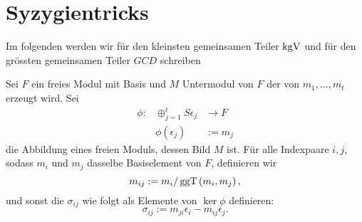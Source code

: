 \documentclass{article}
\begin{document}
\section{Syzygientricks}
	\begin{defn}
		Im folgenden werden wir f\"ur den kleinsten gemeinsamen Teiler
		\( \operatorname{kgV} \)
		und f\"ur den gr\"ossten gemeinsamen Teiler
		\( GCD \)
		schreiben
	\end{defn}
	\begin{nota}
		Sei 
		\( F \) 
		ein freies Modul mit Basis 
		und
		\( M \)
		Untermodul von 
		\( F \)
		der von 
		\( m_{1} , \dots , m_{t} \)
		erzeugt wird.
		Sei
		\begin{align*}
			\phi:	& \oplus_{j=1}^{t} S\epsilon_{j} &\to   F \\
				& \phi\left( \epsilon_{j} \right) &:=  m_{j}
		\end{align*}
		die Abbildung eines freien Moduls, dessen Bild
		\( M \)
		ist.
		F\"ur alle Indexpaare 	
		\( i,j \),
		sodass 
		\( m_{i}\)
		und 
		\( m_{j}\)
		dasselbe Basiselement von 
		\( F \),
		definieren wir 
		\[
			m_{ij} := m_{i}/\operatorname{ggT}\left( m_{i},m_{j} \right) ,
		\]
		und sonst die 
		\( \sigma_{ij}\)
		wie folgt als Elemente von 
		\( \ker \phi \)
		definieren:
		\[
			\sigma_{ij} := m_{ji}\epsilon_{i}-m_{ij}\epsilon_{j} .
		\]

	\end{nota}
\end{document}
